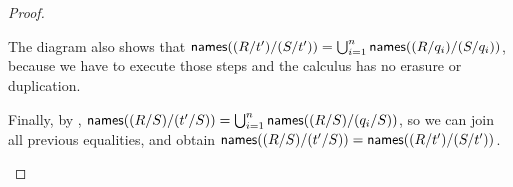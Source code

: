 \begin{proof}
\begin{gonzaenv}
\begin{enumerate}
\begin{enumerate}
\begin{enumerate}
            The diagram also shows that
            $\mathsf{names}((R / t') / (S / t')) = \bigcup_{i=1}^n \mathsf{names}((R / q_i) / (S / q_i))$, because we have to execute those steps and the calculus has no erasure or duplication.

            Finally, by ,
            $\mathsf{names}((R / S) / (t' / S)) = \bigcup_{i=1}^n \mathsf{names}((R / S) / (q_i / S))$,
            so we can join all previous equalities, and obtain
            $\mathsf{names}((R / S) / (t' / S)) = \mathsf{names}((R / t') / (S / t'))$.
        \end{enumerate}
    \end{enumerate}
\end{enumerate}
\end{gonzaenv}
\end{proof}



